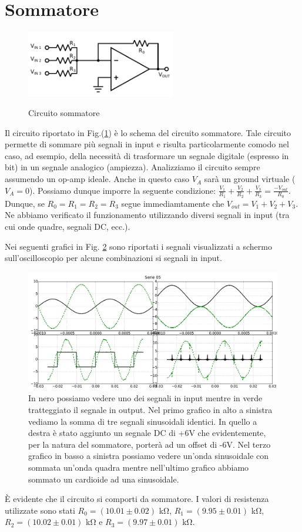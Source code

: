 \section{Sommatore}

\begin{figure}
	\caption{Circuito sommatore}
	\includegraphics[width=65mm]{ccsum.pdf}
	\label{fig:ccsum}
\end{figure}

Il circuito riportato in Fig.(\ref{fig:ccsum}) è lo schema del circuito sommatore.
Tale circuito permette di sommare più segnali in input e risulta particolarmente comodo nel caso, ad esempio, della necessità di trasformare un segnale digitale (espresso in bit) in un segnale analogico (ampiezza).
Analizziamo il circuito sempre assumendo un op-amp ideale.
Anche in questo caso $V_A$ sarà un ground virtuale ($V_A = 0$).
Possiamo dunque imporre la seguente condizione: $\frac{V_1}{R_1}+\frac{V_2}{R_2}+\frac{V_3}{R_3}=\frac{-V_{out}}{R_0}$.
Dunque, se $R_0=R_1=R_2=R_3$ segue immediamtamente che $V_{out}=V_1+V_2+V_3$.
Ne abbiamo verificato il funzionamento utilizzando diversi segnali in input (tra cui onde quadre, segnali DC, ecc.).

Nei seguenti grafici in Fig. \ref{fig:sum} sono riportati i segnali visualizzati a schermo sull'oscilloscopio per alcune combinazioni si segnali in input.

\begin{figure}[h]
	\centering
			\includegraphics[width=.9\textwidth]{sum_serie_05.pdf}
			\caption{In nero possiamo vedere uno dei segnali in input mentre in verde tratteggiato il segnale in output. Nel primo grafico in alto a sinistra vediamo la somma di tre segnali sinusoidali identici. In quello a destra è stato aggiunto un segnale DC di +6V che evidentemente, per la natura del sommatore, porterà ad un offset di -6V. Nel terzo grafico in basso a sinistra possiamo vedere un'onda sinusoidale con sommata un'onda quadra mentre nell'ultimo grafico abbiamo sommato un cardioide ad una sinusoidale.}
			\label{fig:sum}
\end{figure}

È evidente che il circuito si comporti da sommatore. I valori di resistenza utilizzate sono stati $R_0=(10.01\pm0.02)$ \si{\kilo\ohm}, $R_1=(9.95\pm0.01)$ \si{\kilo\ohm}, $R_2=(10.02\pm 0.01)$ \si{\kilo\ohm} e $R_3=(9.97\pm0.01)$ \si{\kilo\ohm}. \phantom{xxxxxxxxxxxxxxxxxxxxxxxxxxxxxxxxxxxxxxxx}